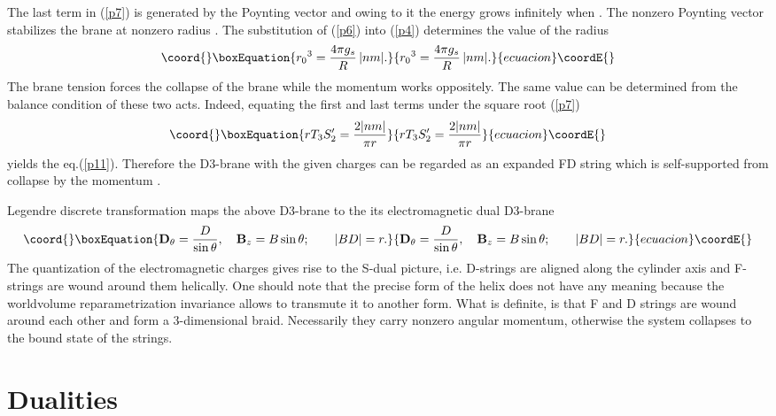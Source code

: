 \documentclass[a4paper,12pt]{article}
\begin{document}
The last term in (\ref{p7}) is generated by the 
Poynting vector and owing to it the energy grows infinitely 
when \coordHE{}. The nonzero Poynting vector \coordHE{} 
stabilizes the brane at nonzero radius \coordHE{}. The substitution of 
(\ref{p6}) into  (\ref{p4}) determines the value of the radius \coordHE{}  
\begin{equation}\coord{}\boxEquation{
{r_0}^3=\frac{4\pi g_s}{R}\,|nm|.
\label{p11}
}{
{r_0}^3=\frac{4\pi g_s}{R}\,|nm|.
}{ecuacion}\coordE{}\end{equation}
The brane tension forces the collapse of the brane while the momentum 
works oppositely. The same value \coordHE{} can be determined from the balance 
condition of these two acts. Indeed, equating the first and last 
terms under the square root (\ref{p7}) 
\begin{equation}\coord{}\boxEquation{
rT_3S_2^{\prime}=\frac{2|nm|}{\pi r}
\label{p12}
}{
rT_3S_2^{\prime}=\frac{2|nm|}{\pi r}
}{ecuacion}\coordE{}\end{equation}
yields the eq.(\ref{p11}).
Therefore the D3-brane with the given charges
can be regarded as an expanded FD string which is 
self-supported from collapse by the momentum \myHighlight{$\d\times\m$}\coordHE{}.

\noindent

Legendre discrete transformation maps the above D3-brane to the its 
electromagnetic dual D3-brane
\begin{equation}\coord{}\boxEquation{
\d_{\theta}=\frac{D}{\sin\theta},\quad \m_z=B\sin\theta ;\qquad |BD|=r.
\label{p13}
}{
\d_{\theta}=\frac{D}{\sin\theta},\quad \m_z=B\sin\theta ;\qquad |BD|=r.
}{ecuacion}\coordE{}\end{equation}
The quantization of the electromagnetic charges gives rise to the S-dual 
picture, i.e. D-strings are aligned along the cylinder axis and F-strings 
are wound around them helically.
One should note that the precise form of the helix does not have 
any meaning because the worldvolume reparametrization invariance allows to
transmute it to another form. What is definite, is that F and D strings are
wound around each other and form a 3-dimensional braid. Necessarily they 
carry nonzero angular momentum, otherwise the system collapses to the bound 
state of the strings.

\section{Dualities}
\end{document}
